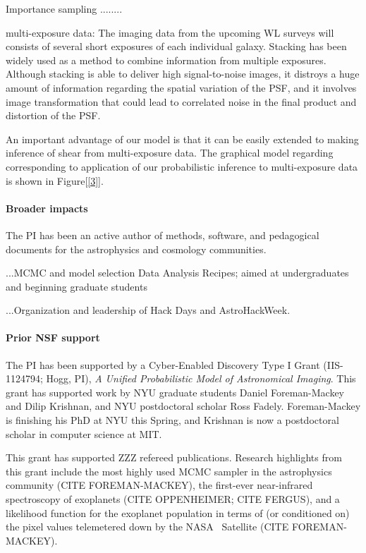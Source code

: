 \documentclass[12pt]{article}
\begin{document}
Importance sampling ........

multi-exposure data:
The imaging data from the upcoming WL surveys will consists of several
short exposures of each individual galaxy. Stacking has been widely used
as a method to combine information from multiple exposures. 
Although stacking is able to deliver high signal-to-noise images, it distroys a
huge amount of information regarding the spatial variation of
the PSF, and it involves image transformation that could lead to correlated noise
in the final product and distortion of the PSF.

An important advantage of our model is that it can be easily extended
to making inference of shear from multi-exposure data. The graphical model 
regarding corresponding to application of our probabilistic inference to
multi-exposure data is shown in Figure[\ref{3}].

\paragraph{Broader impacts}

The PI has been an active author of methods, software, and pedagogical
documents for the astrophysics and cosmology communities.

...MCMC and model selection Data Analysis Recipes; aimed at undergraduates and beginning graduate students

...Organization and leadership of Hack Days and AstroHackWeek.

\paragraph{Prior NSF support}

The PI has been supported by a Cyber-Enabled Discovery Type I Grant
(IIS-1124794; Hogg, PI), \textit{A Unified Probabilistic Model of
  Astronomical Imaging}.
This grant has supported work by NYU graduate students Daniel
Foreman-Mackey and Dilip Krishnan, and NYU postdoctoral scholar Ross
Fadely.
Foreman-Mackey is finishing his PhD at NYU this Spring, and Krishnan
is now a postdoctoral scholar in computer science at MIT.

This grant has supported ZZZ refereed publications.
Research highlights from this grant include the most highly used MCMC
sampler in the astrophysics community (CITE FOREMAN-MACKEY), the
first-ever near-infrared spectroscopy of exoplanets (CITE OPPENHEIMER;
CITE FERGUS), and a likelihood function for the exoplanet population
in terms of (or conditioned on) the pixel values telemetered down by
the NASA \kepler\ Satellite (CITE FOREMAN-MACKEY).
\end{document}
